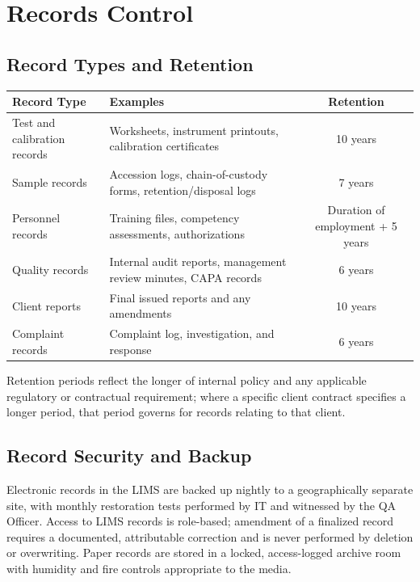 
\section{Records Control}

\subsection{Record Types and Retention}

\begin{table}[h]
\centering
\small
\renewcommand{\arraystretch}{1.3}
\begin{tabularx}{\linewidth}{@{}l X c@{}}
\toprule
\textbf{Record Type} & \textbf{Examples} & \textbf{Retention} \\
\midrule
Test and calibration records & Worksheets, instrument printouts, calibration certificates &
10 years \\
Sample records & Accession logs, chain-of-custody forms, retention/disposal logs & 7 years \\
Personnel records & Training files, competency assessments, authorizations & Duration of
employment + 5 years \\
Quality records & Internal audit reports, management review minutes, CAPA records & 6 years \\
Client reports & Final issued reports and any amendments & 10 years \\
Complaint records & Complaint log, investigation, and response & 6 years \\
\bottomrule
\end{tabularx}
\end{table}

Retention periods reflect the longer of internal policy and any applicable regulatory or
contractual requirement; where a specific client contract specifies a longer period, that
period governs for records relating to that client.

\subsection{Record Security and Backup}

Electronic records in the LIMS are backed up nightly to a geographically separate site, with
monthly restoration tests performed by IT and witnessed by the QA Officer. Access to LIMS
records is role-based; amendment of a finalized record requires a documented, attributable
correction and is never performed by deletion or overwriting. Paper records are stored in a
locked, access-logged archive room with humidity and fire controls appropriate to the media.

